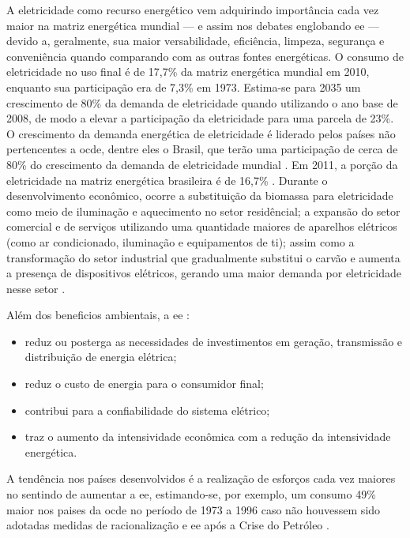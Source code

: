 A eletricidade como recurso energético vem adquirindo importância cada vez maior na 
matriz energética mundial --- e assim nos debates englobando \gls{ee} ---
devido a, geralmente, sua maior versabilidade, eficiência, limpeza, segurança e conveniência 
quando comparando com as outras fontes energéticas. O consumo de eletricidade no uso final é de 17,7\% 
da matriz energética mundial em 2010, enquanto sua participação era de 7,3\% em 1973. Estima-se para 2035 um
crescimento de 80\% da demanda de eletricidade quando utilizando o ano base de
2008, de modo a elevar a participação da eletricidade para uma parcela de 23\%. O crescimento da demanda energética 
de eletricidade é liderado pelos países não pertencentes a \gls{ocde}, dentre
eles o Brasil, que terão uma participação de cerca de 80\% do crescimento da demanda de
eletricidade mundial \cite{iea_weo2010}. Em 2011, a porção da eletricidade na matriz 
energética brasileira é de 16,7\% \cite{ben2012}. Durante o desenvolvimento econômico, ocorre a
substituição da biomassa para eletricidade como meio de iluminação e aquecimento
no setor residêncial; a expansão do setor comercial e de serviços utilizando uma quantidade
maiores de aparelhos elétricos (como ar condicionado, iluminação e equipamentos
de \acrshort{ti}); assim como a transformação do setor industrial que
gradualmente substitui o carvão e aumenta a presença de dispositivos elétricos, gerando uma
maior demanda por eletricidade nesse setor \cite{iea_weo2010}.

Além dos beneficios ambientais, a \gls{ee} \cite{jannuzzi,epe_slides_eficiencia}: 

\begin{itemize}
\item reduz ou posterga as necessidades de investimentos em geração, transmissão 
e distribuição de energia elétrica; 
\item reduz o custo de energia para o consumidor final; 
\item contribui para a confiabilidade do sistema elétrico; 
\item traz o aumento da intensividade econômica com a redução da intensividade
energética. 
\end{itemize}

A tendência nos países desenvolvidos é a realização de esforços 
cada vez maiores no sentindo de aumentar a \gls{ee}, 
estimando-se, por exemplo, um consumo 49\% maior nos paises da \gls{ocde} 
no período de 1973 a 1996 caso não houvessem sido adotadas medidas de 
racionalização e \gls{ee} após a Crise do Petróleo
\cite{goldemberg,epe_slides_eficiencia}.

